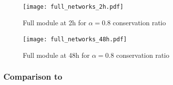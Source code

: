\begin{figure}[p]
  \centering
  \texttt{[image: full\_networks\_2h.pdf]}
  \caption{Full module at \unit{2}{h} for $\alpha = 0.8$ conservation ratio}
  \label{fig:full_1}
\end{figure}

\begin{figure}[p]
  \centering
  \texttt{[image: full\_networks\_48h.pdf]}
  \caption{Full module at \unit{48}{h} for $\alpha = 0.8$ conservation ratio}
  \label{fig:full_2}
\end{figure}




\subsubsection{Comparison to \nexus{}}
\label{sec:Nexus}

